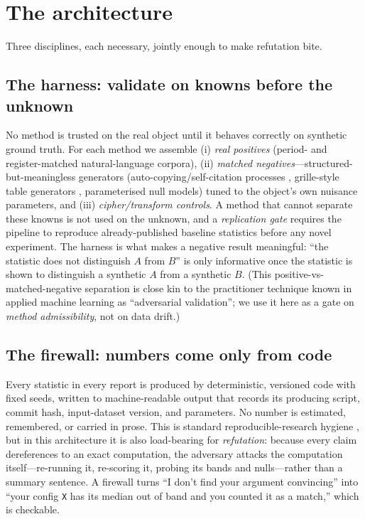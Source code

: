 \documentclass[11pt]{article}
\begin{document}
\section{The architecture}
Three disciplines, each necessary, jointly enough to make refutation bite.

\subsection{The harness: validate on knowns before the unknown}
No method is trusted on the real object until it behaves correctly on synthetic ground truth.
For each method we assemble (i) \emph{real positives} (period- and register-matched
natural-language corpora), (ii) \emph{matched negatives}---structured-but-meaningless
generators (auto-copying/self-citation processes \citep{timm2020selfcitation}, grille-style
table generators \citep{rugg2004elegant}, parameterised null models) tuned to the object's
own nuisance parameters, and (iii) \emph{cipher/transform controls}. A method that cannot
separate these knowns is not used on the unknown, and a \emph{replication gate} requires the
pipeline to reproduce already-published baseline statistics before any novel experiment. The
harness is what makes a negative result meaningful: ``the statistic does not distinguish $A$
from $B$'' is only informative once the statistic is shown to distinguish a synthetic $A$
from a synthetic $B$. (This positive-vs-matched-negative separation is close kin to the
practitioner technique known in applied machine learning as ``adversarial validation''; we
use it here as a gate on \emph{method admissibility}, not on data drift.)

\subsection{The firewall: numbers come only from code}
Every statistic in every report is produced by deterministic, versioned code with fixed
seeds, written to machine-readable output that records its producing script, commit hash,
input-dataset version, and parameters. No number is estimated, remembered, or carried in
prose. This is standard reproducible-research hygiene \citep{sandve2013ten}, but in this
architecture it is also load-bearing for \emph{refutation}: because every claim dereferences
to an exact computation, the adversary attacks the computation itself---re-running it,
re-scoring it, probing its bands and nulls---rather than a summary sentence. A firewall turns
``I don't find your argument convincing'' into ``your config \texttt{X} has its median out of
band and you counted it as a match,'' which is checkable.
\end{document}
